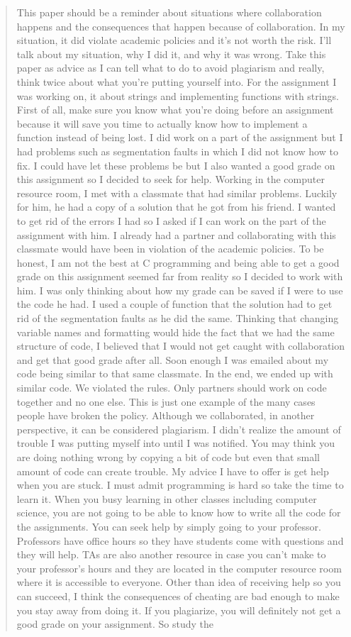 \documentclass[12pt]{scrartcl}
\begin{document}
\begin{quote}
This paper should be a reminder about situations where collaboration happens and the consequences that happen because of collaboration. In my situation, it did violate academic policies and it's not worth the risk. I'll talk about my situation, why I did it, and why it was wrong. Take this paper as advice as I can tell what to do to avoid plagiarism and really, think twice about what you're putting yourself into.
For the assignment I was working on, it about strings and implementing functions with strings. First of all, make sure you know what you're doing before an assignment because it will save you time to actually know how to implement a function instead of being lost. I did work on a part of the assignment but I had problems such as segmentation faults in which I did not know how to fix. I could have let these problems be but I also wanted a good grade on this assignment so I decided to seek for help. Working in the computer resource room, I met with a classmate that had similar problems. Luckily for him, he had a copy of a solution that he got from his friend. I wanted to get rid of the errors I had so I asked if I can work on the part of the assignment with him. I already had a partner and collaborating with this classmate would have been in violation of the academic policies. To be honest, I am not the best at C programming and being able to get a good grade on this assignment seemed far from reality so I decided to work with him. I was only thinking about how my grade can be saved if I were to use the code he had. I used a couple of function that the solution had to get rid of the segmentation faults as he did the same. Thinking that changing variable names and formatting would hide the fact that we had the same structure of code, I believed that I would not get caught with collaboration and get that good grade after all. Soon enough I was emailed about my code being similar to that same classmate. In the end, we ended up with similar code. We violated the rules. Only partners should work on code together and no one else. This is just one example of the many cases people have broken the policy. Although we collaborated, in another perspective, it can be considered plagiarism. I didn't realize the amount of trouble I was putting myself into until I was notified. You may think you are doing nothing wrong by copying a bit of code but even that small amount of code can create trouble. My advice I have to offer is get help when you are stuck. I must admit programming is hard so take the time to learn it. When you busy learning in other classes including computer science, you are not going to be able to know how to write all the code for the assignments. You can seek help by simply going to your professor. Professors have office hours so they have students come with questions and they will help. TAs are also another resource in case you can't make to your professor's hours and they are located in the computer resource room where it is accessible to everyone. Other than idea of receiving help so you can succeed, I think the consequences of cheating are bad enough to make you stay away from doing it. If you plagiarize, you will definitely not get a good grade on your assignment. So study the 
\end{quote}
\end{document}
